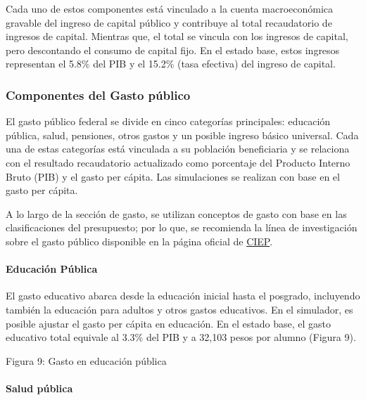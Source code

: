 
Cada uno de estos componentes está vinculado a la cuenta macroeconómica
gravable del ingreso de capital público y contribuye al total
recaudatorio de ingresos de capital. Mientras que, el total se vincula
con los ingresos de capital, pero descontando el consumo de capital
fijo. En el estado base, estos ingresos representan el 5.8\% del PIB y
el 15.2\% (tasa efectiva) del ingreso de capital.

\hypertarget{componentes-del-gasto-puxfablico}{%
\subsubsection{Componentes del Gasto
público}\label{componentes-del-gasto-puxfablico}}

El gasto público federal se divide en cinco categorías principales:
educación pública, salud, pensiones, otros gastos y un posible ingreso
básico universal. Cada una de estas categorías está vinculada a su
población beneficiaria y se relaciona con el resultado recaudatorio
actualizado como porcentaje del Producto Interno Bruto (PIB) y el gasto
per cápita. Las simulaciones se realizan con base en el gasto per
cápita.

A lo largo de la sección de gasto, se utilizan conceptos de gasto con
base en las clasificaciones del presupuesto; por lo que, se recomienda
la línea de investigación sobre el gasto público disponible en la página
oficial de \href{https://ciep.mx/investigaciones/}{CIEP}.

\hypertarget{educaciuxf3n-puxfablica}{%
\paragraph{Educación Pública}\label{educaciuxf3n-puxfablica}}

El gasto educativo abarca desde la educación inicial hasta el posgrado,
incluyendo también la educación para adultos y otros gastos educativos.
En el simulador, es posible ajustar el gasto per cápita en educación. En
el estado base, el gasto educativo total equivale al 3.3\% del PIB y a
32,103 pesos por alumno (Figura 9).

Figura 9: Gasto en educación pública


\hypertarget{salud-puxfablica}{%
\paragraph{Salud pública}\label{salud-puxfablica}}


